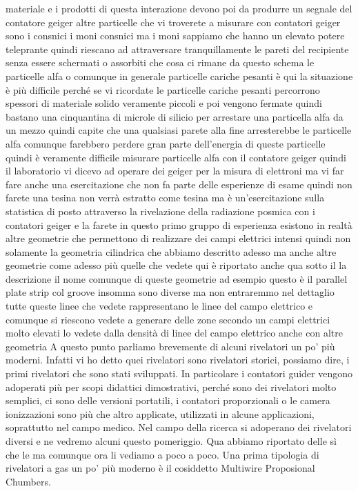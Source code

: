 {materiale e i prodotti di questa interazione devono poi da produrre un segnale del contatore geiger altre particelle che vi troverete a misurare con contatori geiger sono i consnici i moni consnici ma i moni sappiamo che hanno un elevato potere teleprante quindi riescano ad attraversare tranquillamente le pareti del recipiente senza essere schermati o assorbiti che cosa ci rimane da questo schema le particelle alfa o comunque in generale particelle cariche pesanti è qui la situazione è più difficile perché se vi ricordate le particelle cariche pesanti percorrono spessori di materiale solido veramente piccoli e poi vengono fermate quindi bastano una cinquantina di microle di silicio per arrestare una particella alfa da un mezzo quindi capite che una qualsiasi parete alla fine arresterebbe le particelle alfa comunque farebbero perdere gran parte dell'energia di queste particelle quindi è veramente difficile misurare particelle alfa con il contatore geiger quindi il laboratorio vi dicevo ad operare dei geiger per la misura di elettroni ma vi far fare anche una esercitazione che non fa parte delle esperienze di esame quindi non farete una tesina non verrà estratto come tesina ma è un'esercitazione sulla statistica di posto attraverso la rivelazione della radiazione posmica con i contatori geiger e la farete in questo primo gruppo di esperienza esistono in realtà altre geometrie che permettono di realizzare dei campi elettrici intensi quindi non solamente la geometria cilindrica che abbiamo descritto adesso ma anche altre geometrie come adesso più quelle che vedete qui è riportato anche qua sotto il la descrizione il nome comunque di queste geometrie ad esempio questo è il parallel plate strip col groove insomma sono diverse ma non entraremmo nel dettaglio tutte queste linee che vedete rappresentano le linee del campo elettrico e comunque si riescono vedete a generare delle zone secondo un campi elettrici molto elevati lo vedete dalla densità di linee del campo elettrico anche con altre geometria A questo punto parliamo brevemente di alcuni rivelatori un po' più moderni. Infatti vi ho detto quei rivelatori sono rivelatori storici, possiamo dire, i primi rivelatori che sono stati sviluppati. In particolare i contatori guider vengono adoperati più per scopi didattici dimostrativi, perché sono dei rivelatori molto semplici, ci sono delle versioni portatili, i contatori proporzionali o le camera ionizzazioni sono più che altro applicate, utilizzati in alcune applicazioni, soprattutto nel campo medico. Nel campo della ricerca si adoperano dei rivelatori diversi e ne vedremo alcuni questo pomeriggio. Qua abbiamo riportato delle sì che le ma comunque ora li vediamo a poco a poco. Una prima tipologia di rivelatori a gas un po' più moderno è il cosiddetto Multiwire Proposional Chumbers. 

}
